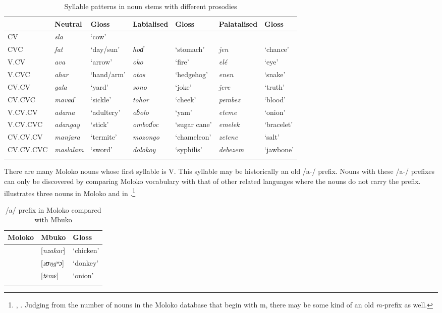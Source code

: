 \begin{sidewaystable}
\caption{Syllable patterns in noun stems with different prosodies\label{tab:4.24}}
\begin{tabular}{lllllll} \lsptoprule & {Neutral  } & {Gloss} & {Labialised} & {Gloss} & {Palatalised} & {Gloss}\\\midrule
{CV} & \textit{sla} & ‘cow’ &  &  &  & \\
{CVC} & \textit{fat} & ‘day/sun’ & \textit{hoɗ} & ‘stomach’ & \textit{jen} & ‘chance’\\
{V.CV} & \textit{ava} & ‘arrow’ & \textit{oko} & ‘fire’ & \textit{el\'{e}} & ‘eye’\\
{V.CVC} & \textit{ahar} & ‘hand/arm’ & \textit{otos} & ‘hedgehog’ & \textit{enen} & ‘snake’\\
{CV.CV} & \textit{gala} & ‘yard’ & \textit{sono} & ‘joke’ & \textit{jere} & ‘truth’\\
{CV.CVC} & \textit{mavaɗ} & ‘sickle’ & \textit{tohor} & ‘cheek’ & \textit{pembez} & ‘blood’\\
{V.CV.CV} & \textit{adama} & ‘adultery’ & \textit{oɓolo} & ‘yam’ & \textit{eteme} & ‘onion’\\
{V.CV.CVC} & \textit{adangay} & ‘stick’ & \textit{omboɗoc} & ‘sugar cane’ & \textit{emelek} & ‘bracelet’\\
{CV.CV.CV} & \textit{manjara} & ‘termite’ & \textit{mozongo} & ‘chameleon’ & \textit{zetene} & ‘salt’\\
{CV.CV.CVC} & \textit{maslalam} & ‘sword’ & \textit{dolokoy} & ‘syphilis’ & \textit{debezem} & ‘jawbone’\\
\lspbottomrule
\end{tabular}
\end{sidewaystable}

There are many Moloko nouns whose first syllable is V. This syllable may be historically an old /a-/ prefix. Nouns with these /a-/ prefixes can only be discovered by comparing Moloko vocabulary with that of other related languages where the nouns do not carry the prefix.  illustrates three nouns in Moloko and in .\footnote{\citet{Mbuagbaw1995}, \citet{Gravina2001}. Judging from the number of nouns in the Moloko database that begin with m, there may be some kind of an old \textit{m-}prefix as well.} 

\begin{table}
\begin{tabular}{lll}
\lsptoprule
{Moloko} & {Mbuko} & {Gloss}\\
\midrule{}  & [\textit{nzakar}]  & ‘chicken’\\ & [\textit{zʊŋgʷɔ}] & ‘donkey’\\ & [\textit{tɛmɛ}] & ‘onion’\\
\lspbottomrule
\end{tabular}
\caption{/a/ prefix in Moloko compared with Mbuko\label{tab:4.25}}
\end{table}

